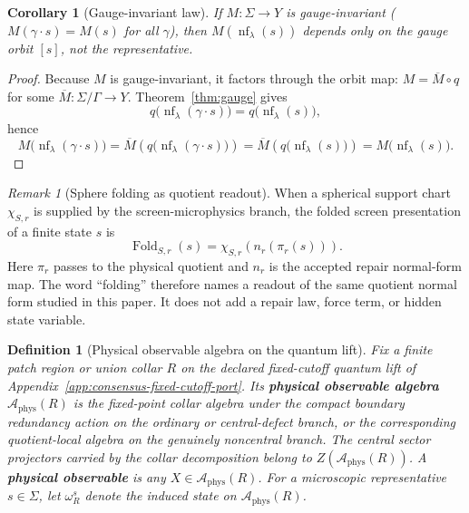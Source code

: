 \documentclass[11pt]{article}
\newtheorem{corollary}[theorem]{Corollary}
\newtheorem{definition}[theorem]{Definition}
\theoremstyle{remark}
\newtheorem{remark}[theorem]{Remark}
\theoremstyle{plain}
\begin{document}
\begin{corollary}[Gauge-invariant law]\label{cor:gaugeinv}
If $M:\Sigma\to Y$ is gauge-invariant ($M(\gamma\cdot s)=M(s)$ for all $\gamma$), then $M(\operatorname{nf}_\lambda(s))$ depends only on the gauge orbit $[s]$, not the representative.
\end{corollary}

\begin{proof}
Because $M$ is gauge-invariant, it factors through the orbit map: $M=\overline M\circ q$ for some
$\overline M:\Sigma/\Gamma\to Y$. Theorem~\ref{thm:gauge} gives
\[
q\bigl(\operatorname{nf}_\lambda(\gamma\cdot s)\bigr)
=
q\bigl(\operatorname{nf}_\lambda(s)\bigr),
\]
hence
\[
M\bigl(\operatorname{nf}_\lambda(\gamma\cdot s)\bigr)
=
\overline M\!\left(q\bigl(\operatorname{nf}_\lambda(\gamma\cdot s)\bigr)\right)
=
\overline M\!\left(q\bigl(\operatorname{nf}_\lambda(s)\bigr)\right)
=
M\bigl(\operatorname{nf}_\lambda(s)\bigr).
\]
\end{proof}

\begin{remark}[Sphere folding as quotient readout]\label{rem:sphere-folding}
When a spherical support chart \(\chi_{S,r}\) is supplied by the screen-microphysics
branch, the folded screen presentation of a finite state \(s\) is
\[
\operatorname{Fold}_{S,r}(s)
=
\chi_{S,r}\!\left(n_r(\pi_r(s))\right).
\]
Here \(\pi_r\) passes to the physical quotient and \(n_r\) is the accepted
repair normal-form map. The word ``folding'' therefore names a readout of the
same quotient normal form studied in this paper. It does not add a repair law,
force term, or hidden state variable.
\end{remark}

\begin{definition}[Physical observable algebra on the quantum lift]\label{def:physobs}
Fix a finite patch region or union collar \(R\) on the declared fixed-cutoff quantum lift of
Appendix~\ref{app:consensus-fixed-cutoff-port}. Its \textbf{physical observable algebra}
\(\mathcal A_{\mathrm{phys}}(R)\) is the fixed-point collar algebra under the compact boundary
redundancy action on the ordinary or central-defect branch, or the corresponding quotient-local
algebra on the genuinely noncentral branch. The central sector projectors carried by the collar
decomposition belong to \(Z(\mathcal A_{\mathrm{phys}}(R))\). A \textbf{physical observable} is
any \(X\in \mathcal A_{\mathrm{phys}}(R)\). For a microscopic representative \(s\in\Sigma\), let
\(\omega_R^s\) denote the induced state on \(\mathcal A_{\mathrm{phys}}(R)\).
\end{definition}
\end{document}
